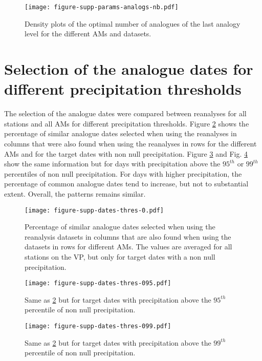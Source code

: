 \documentclass[twocolumn]{svjour3}       %
\begin{document}
	\begin{figure}
		\texttt{[image: figure-supp-params-analogs-nb.pdf]}\\
		\caption{Density plots of the optimal number of analogues of the last analogy level for the different AMs and datasets.}
		\label{fig:number_analogues}
	\end{figure}



	\section{Selection of the analogue dates for different precipitation thresholds}
	\label{supp:analogue_days}
	
	The selection of the analogue dates were compared between reanalyses for all stations and all AMs for different precipitation thresholds. Figure \ref{fig:similarities_analogue_dates_0} shows the percentage of similar analogue dates selected when using the reanalyses in columns that were also found when using the reanalyses in rows for the different AMs and for the target dates with non null precipitation. Figure \ref{fig:similarities_analogue_dates_095} and Fig. \ref{fig:similarities_analogue_dates_099} show the same information but for days with precipitation above the $95^{th}$ or $99^{th}$ percentiles of non null precipitation. For days with higher precipitation, the percentage of common analogue dates tend to increase, but not to substantial extent. Overall, the patterns remains similar.	
	
	\begin{figure}
		\texttt{[image: figure-supp-dates-thres-0.pdf]}\\
		\caption{Percentage of similar analogue dates selected when using the reanalysis datasets in columns that are also found when using the datasets in rows for different AMs. The values are averaged for all stations on the VP, but only for target dates with a non null precipitation.}
		\label{fig:similarities_analogue_dates_0}
	\end{figure}
	
	\begin{figure}
		\texttt{[image: figure-supp-dates-thres-095.pdf]}\\
		\caption{Same as \ref{fig:similarities_analogue_dates_0} but for target dates with precipitation above the $95^{th}$ percentile of non null precipitation.}
		\label{fig:similarities_analogue_dates_095}
	\end{figure}

	\begin{figure}
		\texttt{[image: figure-supp-dates-thres-099.pdf]}\\
		\caption{Same as \ref{fig:similarities_analogue_dates_0} but for target dates with precipitation above the $99^{th}$ percentile of non null precipitation.}
		\label{fig:similarities_analogue_dates_099}
	\end{figure}

	
	
\end{document}
